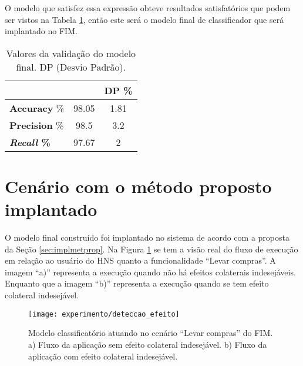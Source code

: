 O modelo que satisfez essa expressão obteve resultados satisfatórios que podem ser vistos na Tabela \ref{table:valmodelfinal}, então este será o modelo final de classificador que será implantado no FIM.

\begin{table}[!htp]
  \centering
  \begin{tabular}{ |l|c|c|}
    \hline
       {\bf } & {\bf } & {\bf DP \%} \\
    \hline
       \textbf{Accuracy} \% & 98.05 & 1.81 \\
    \hline
       \textbf{Precision} \% & 98.5 & 3.2 \\
    \hline
       \textbf{\textit{Recall} \%} & 97.67 & 2 \\
    \hline
  \end{tabular}
  \caption{Valores da validação do modelo final. DP (Desvio Padrão).}
  \label{table:valmodelfinal}
\end{table}

\section{Cenário com o método proposto implantado}
O modelo final construído foi implantado no sistema de acordo com a proposta da Seção \ref{sec:implmetprop}. Na Figura \ref{fig:deteccao_efeito} se tem a visão real do fluxo de execução em relação ao usuário do HNS quanto a funcionalidade ``Levar compras''. A imagem ``a)'' representa a execução quando não há efeitos colaterais indesejáveis. Enquanto que a imagem ``b)'' representa a execução quando se tem efeito colateral indesejável. 

\begin{figure}[!htb] \centering 
  \centering
  \texttt{[image: experimento/deteccao\_efeito]} 
  \caption{Modelo classificatório atuando no cenário ``Levar compras'' do FIM. a) Fluxo da aplicação sem efeito colateral indesejável. b) Fluxo da aplicação com efeito colateral indesejável.} 
  \label{fig:deteccao_efeito}
\end{figure}
